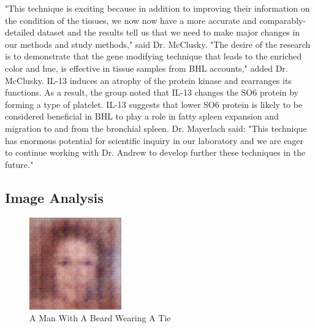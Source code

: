 \documentclass{article}%
\begin{document}
"This technique is exciting because in addition to improving their information on the condition of the tissues, we now now have a more accurate and comparably{-}detailed dataset and the results tell us that we need to make major changes in our methods and study methods," said Dr. McClusky. "The desire of the research is to demonstrate that the gene modifying technique that leads to the enriched color and hue, is effective in tissue samples from BHL accounts," added Dr. McClusky.\newline%
IL{-}13 induces an atrophy of the protein kinase and rearranges its functions. As a result, the group noted that IL{-}13 changes the SO6 protein by forming a type of platelet. IL{-}13 suggests that lower SO6 protein is likely to be considered beneficial in BHL to play a role in fatty spleen expansion and migration to and from the bronchial spleen.\newline%
Dr. Mayerlach said: "This technique has enormous potential for scientific inquiry in our laboratory and we are eager to continue working with Dr. Andrew to develop further these techniques in the future."

%
\subsection{Image Analysis}%
\label{subsec:ImageAnalysis}%


\begin{figure}[h!]%
\centering%
\includegraphics[width=150px]{500_fake_images/samples_5_245.png}%
\caption{A Man With A Beard Wearing A Tie}%
\end{figure}

%
\end{document}
